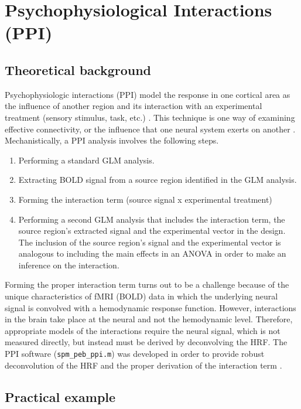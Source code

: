 \chapter{Psychophysiological Interactions (PPI)}

\section{Theoretical background}

Psychophysiologic interactions (PPI) model the response in one cortical area as the influence of another region and its interaction with an experimental treatment (sensory stimulus, task, etc.) \cite{ppi}. This technique is one way of examining effective connectivity, or the influence that one neural system exerts on another \cite{func1}. Mechanistically, a PPI analysis involves the following steps. 
\begin{enumerate}
\item Performing a standard GLM analysis.
\item Extracting BOLD signal from a source region identified in the GLM analysis.
\item Forming the interaction term (source signal x experimental treatment)
\item Performing a second GLM analysis that includes the interaction term, the source region's extracted signal and the experimental vector in the design. The inclusion of the source region's signal and the experimental vector is analogous to including the main effects in an ANOVA in order to make an inference on the interaction.
\end{enumerate} 

Forming the proper interaction term turns out to be a challenge because of the unique characteristics of fMRI (BOLD) data in which the underlying neural signal is convolved with a hemodynamic response function. However, interactions in the brain take place at the neural and not the hemodynamic level. Therefore, appropriate models of the interactions require the neural signal, which is not measured directly, but instead must be derived by deconvolving the HRF. The PPI software (\texttt{spm\_peb\_ppi.m}) was developed in order to provide robust deconvolution of the HRF and the proper derivation of the interaction term \cite{gitelman_03}.

\section{Practical example}

